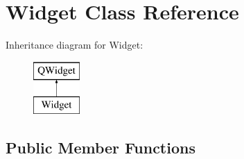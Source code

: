\hypertarget{class_widget}{}\section{Widget Class Reference}
\label{class_widget}
Inheritance diagram for Widget\+:\begin{figure}[H]
\begin{center}
\leavevmode
\includegraphics[height=2.000000cm]{class_widget}
\end{center}
\end{figure}
\subsection*{Public Member Functions}
